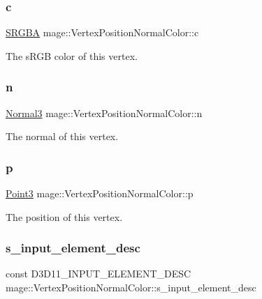 \subsubsection{\texorpdfstring{c}{c}}
{\footnotesize\ttfamily \hyperlink{structmage_1_1_s_r_g_b_a}{S\+R\+G\+BA} mage\+::\+Vertex\+Position\+Normal\+Color\+::c}

The s\+R\+GB color of this vertex. \hypertarget{structmage_1_1_vertex_position_normal_color_a771c7e71e8b6441b73f513f511507650}{}\label{structmage_1_1_vertex_position_normal_color_a771c7e71e8b6441b73f513f511507650} 
\subsubsection{\texorpdfstring{n}{n}}
{\footnotesize\ttfamily \hyperlink{structmage_1_1_normal3}{Normal3} mage\+::\+Vertex\+Position\+Normal\+Color\+::n}

The normal of this vertex. \hypertarget{structmage_1_1_vertex_position_normal_color_a6847c367ca68fb8d8e349c8441ae63dd}{}\label{structmage_1_1_vertex_position_normal_color_a6847c367ca68fb8d8e349c8441ae63dd} 
\subsubsection{\texorpdfstring{p}{p}}
{\footnotesize\ttfamily \hyperlink{structmage_1_1_point3}{Point3} mage\+::\+Vertex\+Position\+Normal\+Color\+::p}

The position of this vertex. \hypertarget{structmage_1_1_vertex_position_normal_color_a1d14ae159608683093a33b38fb6259e4}{}\label{structmage_1_1_vertex_position_normal_color_a1d14ae159608683093a33b38fb6259e4} 
\subsubsection{\texorpdfstring{s\+\_\+input\+\_\+element\+\_\+desc}{s\_input\_element\_desc}}
{\footnotesize\ttfamily const D3\+D11\+\_\+\+I\+N\+P\+U\+T\+\_\+\+E\+L\+E\+M\+E\+N\+T\+\_\+\+D\+E\+SC mage\+::\+Vertex\+Position\+Normal\+Color\+::s\+\_\+input\+\_\+element\+\_\+desc\hspace{0.3cm}{\ttfamily [static]}}

